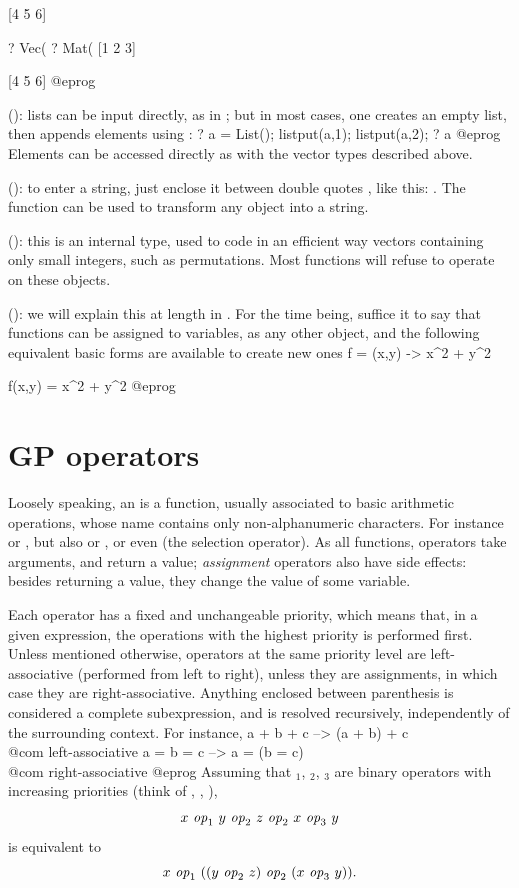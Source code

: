 [4 5 6]

? Vec(%
? Mat(%
[1 2 3]

[4 5 6]
@eprog

 (): lists can be input
directly, as in ; but in most cases, one creates
an empty list, then appends elements using :
\bprog
  ? a = List(); listput(a,1); listput(a,2);
  ? a
@eprog\noindent
Elements can be accessed directly as with the vector types described above.

 (): to
enter a string, just enclose it between double quotes , like this:
. The function  can be used to transform any
object into a string.

 (): this is an internal type,
used to code in an efficient way vectors containing only small integers, such
as permutations. Most  functions will refuse to operate on these
objects.

 (): we will explain this at length in
. For the time being, suffice it to say that
functions can be assigned to variables, as any other object, and the
following equivalent basic forms are available to create new ones
\bprog
  f = (x,y) -> x^2 + y^2

  f(x,y) = x^2 + y^2
@eprog

\section{GP operators}\label{se:operators}

\noindent Loosely speaking, an  is a function, usually
associated to basic arithmetic operations, whose name contains only
non-alphanumeric characters. For instance \kbd{+} or \kbd{-}, but also
\kbd{=} or \kbd{+=}, or even \kbd{[ ]} (the selection operator). As all
functions, operators take arguments, and return a value; \emph{assignment}
operators also have side effects: besides returning a value, they change the
value of some variable.

Each operator has a fixed and unchangeable priority, which means that, in
a given expression, the operations with the highest priority is performed
first. Unless mentioned otherwise, operators at the same priority level are
left-associative (performed from left to right), unless they are assignments,
in which case they are right-associative. Anything enclosed between
parenthesis is considered a complete subexpression, and is resolved
recursively, independently of the surrounding context. For instance,
\bprog
  a + b + c    -->   (a + b) + c     \\@com left-associative
  a = b = c    -->   a = (b = c)     \\@com right-associative
@eprog\noindent
Assuming that $_1$, $_2$, $_3$ are
binary operators with increasing priorities (think of \kbd{+},
\kbd{*}, \kbd{\pow}),
$$ x~\hbox{\it op\/}_1~y~\hbox{\it op\/}_2~z~\hbox{\it op\/}_2~x~\hbox{\it op\/}_3~y $$ is
equivalent to $$ x~\hbox{\it op\/}_1~((y~\hbox{\it op\/}_2~z)~\hbox{\it op\/}_2~
(x~\hbox{\it op\/}_3~y)).$$


